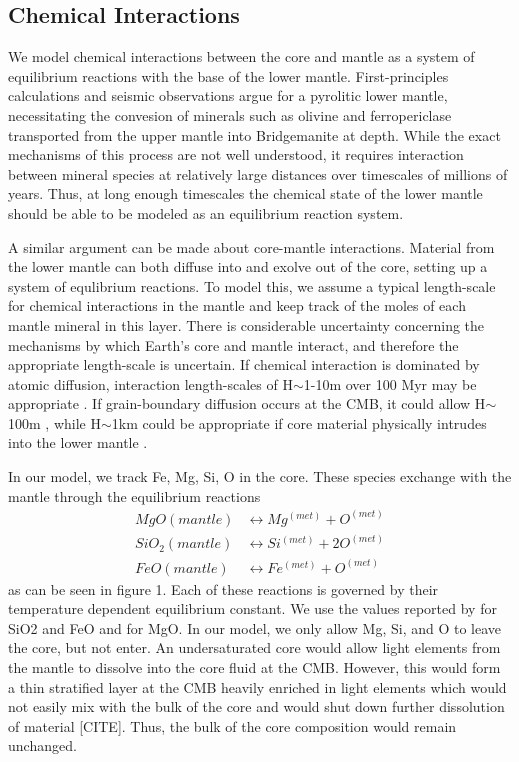\documentclass[]{article}
\begin{document}
	
	\subsection{Chemical Interactions}\label{chemical-interaction-layer}
	We model chemical interactions between the core and mantle as a system of equilibrium reactions with the base of the lower mantle. First-principles calculations and seismic observations argue for a pyrolitic lower mantle, necessitating the convesion of minerals such as olivine and ferropericlase transported from the upper mantle into Bridgemanite at depth. While the exact mechanisms of this process are not well understood, it requires interaction between mineral species at relatively large distances over timescales of millions of years. Thus, at long enough timescales the chemical state of the lower mantle should be able to be modeled as an equilibrium reaction system.
	
	A similar argument can be made about core-mantle interactions. Material from the lower mantle can both diffuse into and exolve out of the core, setting up a system of equlibrium reactions. To model this, we assume a typical length-scale for chemical interactions in the mantle and keep track of the moles of each mantle mineral in this layer. There is considerable uncertainty concerning the mechanisms by which Earth's core and mantle interact, and therefore the appropriate length-scale is uncertain. If chemical interaction is dominated by atomic diffusion, interaction length-scales of H$\sim$1-10m over 100 Myr may be appropriate \citet{Bina2010,VanOrman2003}. If grain-boundary diffusion occurs at the CMB, it could allow H$\sim$100m \citet{Hayden2007}, while H$\sim$1km could be appropriate if core material physically intrudes into the lower mantle \citep{Kanda2006}.
	
	In our model, we track Fe, Mg, Si, O in the core. These species exchange with the mantle through the equilibrium reactions
	\begin{align}
	MgO (mantle) &\leftrightarrow Mg^{(met)} + O^{(met)} \label{eq:m1}\\
	SiO_2 (mantle) &\leftrightarrow Si^{(met)} +2 O^{(met)}\label{eq:m2}\\
	FeO (mantle) &\leftrightarrow Fe^{(met)} +O^{(met)}\label{eq:m3}
	\end{align}
	as can be seen in figure 1. Each of these reactions is governed by their temperature dependent equilibrium constant. We use the values reported by \citep{Hirose2017} for SiO2 and FeO and \citep{Badro2016} for MgO. 	In our model, we only allow Mg, Si, and O to leave the core, but not enter. An undersaturated core would allow light elements from the mantle to dissolve into the core fluid at the CMB. However, this would form a thin stratified layer at the CMB heavily enriched in light elements which would not easily mix with the bulk of the core and would shut down further dissolution of material [CITE]. Thus, the bulk of the core composition would remain unchanged.
	
\end{document}
